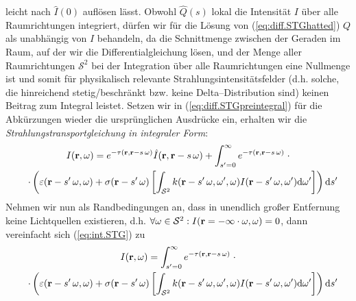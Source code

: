 	leicht nach ${\hat I}(0)$ auflösen lässt. Obwohl ${\hat Q}(s)$ lokal die Intensität $I$ über alle Raumrichtungen integriert, dürfen wir für die Lösung von (\ref{eq:diff.STGhatted}) $Q$ als unabhängig von $I$ behandeln, da die Schnittmenge zwischen der Geraden im Raum, auf der wir die Differentialgleichung lösen, und der Menge aller Raumrichtungen $\mathcal{S}^2$ bei der Integration über alle Raumrichtungen eine Nullmenge ist und somit für physikalisch relevante Strahlungsintensitätsfelder (d.h. solche, die hinreichend stetig/beschränkt bzw. keine Delta--Distribution sind) keinen Beitrag zum Integral leistet.
	Setzen wir in (\ref{eq:diff.STGpreintegral}) für die Abkürzungen wieder die ursprünglichen Ausdrücke ein, erhalten wir die {\em Strahlungstransportgleichung in integraler Form}:
	\begin{multline}
		I(\mathbf{r},\omega) = e^{-\tau(\mathbf{r},\mathbf{r}-s\,\omega)} {\hat I}(\mathbf{r},\mathbf{r}-s\,\omega) + \int_{s'=0}^\infty e^{-\tau(\mathbf{r},\mathbf{r}-s\,\omega)} \;\cdot \\
		\quad\cdot\left( \varepsilon(\mathbf{r}-s'\,\omega,\omega) + \sigma(\mathbf{r}-s'\,\omega)
		\left[ \int_{\mathcal{S}^2} k(\mathbf{r}-s'\,\omega,\omega',\omega)I(\mathbf{r}-s'\,\omega,\omega') \text{d}\omega'\right] \right) \text{d}s'
		\label{eq:int.STG}
	\end{multline}
	Nehmen wir nun als Randbedingungen an, dass in unendlich großer Entfernung keine Lichtquellen existieren, d.h. $\forall \omega \in \mathcal{S}^2 : I(\mathbf{r}=-\infty\cdot\omega,\omega)=0$, dann vereinfacht sich (\ref{eq:int.STG}) zu
	\begin{multline}
		I(\mathbf{r},\omega) = \int_{s'=0}^\infty e^{-\tau(\mathbf{r},\mathbf{r}-s\,\omega)} \;\cdot \\
		\quad\cdot\left( \varepsilon(\mathbf{r}-s'\,\omega,\omega) + \sigma(\mathbf{r}-s'\,\omega)
		\left[ \int_{\mathcal{S}^2} k(\mathbf{r}-s'\,\omega,\omega',\omega)I(\mathbf{r}-s'\,\omega,\omega') \text{d}\omega'\right] \right) \text{d}s'
		\label{eq:int.STGdarkbg}
	\end{multline}


